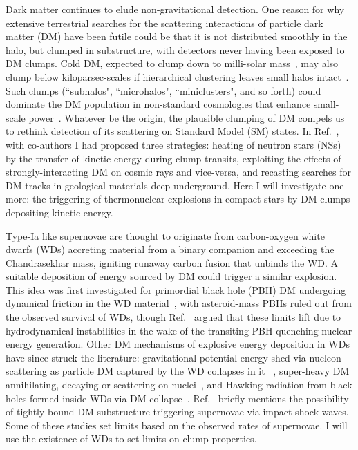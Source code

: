 \documentclass[
    twocolumn,
	prd,
        amssymb,
	preprintnumbers,
	secnumarabic,
	nofootinbib,
	superscriptaddress]{revtex4-1}
\begin{document}
Dark matter continues to elude non-gravitational detection.
One reason for why extensive terrestrial searches for the scattering interactions of particle dark matter (DM) have been futile could be that it is not distributed smoothly in the halo, but clumped in substructure, with detectors never having been exposed to DM clumps.
Cold DM, expected to clump down to milli-solar mass~\cite{Zybin:1999ic,Hofmann:2001bi,Berezinsky:2007qu}, 
may also clump below kiloparsec-scales if hierarchical clustering leaves small halos intact~\cite{BergstromGondolo:1998jj,vandenBosch:2017ynq,vandenBosch:2018tyt}.
Such clumps (``subhalos", ``microhalos", ``miniclusters", and so forth) could dominate the DM population in non-standard cosmologies that enhance small-scale power~\cite{ErickcekSigurdson,Barenboim:2013gya,FanWatson,drorcodecay,inflatflucs,Buckley:2017ttd,nussinovcluster,Barenboim:2021swl,Domenech:2023afs}. 
Whatever be the origin, the plausible clumping of DM compels us to rethink detection of its scattering on Standard Model (SM) states. 
In Ref.~\cite{NSvIR:clumps2021}, with co-authors I had proposed three strategies:
heating of neutron stars (NSs) by the transfer of kinetic energy during clump transits, 
exploiting the effects of strongly-interacting DM on cosmic rays and vice-versa,
and recasting searches for DM tracks in geological materials deep underground.
Here I will investigate one more: the triggering of thermonuclear explosions in compact stars by DM clumps depositing kinetic energy.

Type-Ia like supernovae are thought to originate from carbon-oxygen white dwarfs (WDs) accreting material from a binary companion and exceeding the Chandrasekhar mass, igniting runaway carbon fusion that unbinds the WD.
A suitable deposition of energy sourced by DM could trigger a similar explosion. 
This idea was first investigated for primordial black hole (PBH) DM undergoing dynamical friction in the WD material~\cite{GrahamRajendVarelaPBHWD}, with asteroid-mass PBHs ruled out from the observed survival of WDs, though Ref.~\cite{MonteroCamachoHirata2019} argued that these limits lift due to hydrodynamical instabilities in the wake of the transiting PBH quenching nuclear energy generation.
Other DM mechanisms of explosive energy deposition in WDs have since struck the literature: 
gravitational potential energy shed via nucleon scattering as particle DM captured by the WD collapses in it ~\cite{GrahamRajendVarelaPBHWD,Bramante:2015cua,FedderkeWDCHAMPs:2019jur,SteigerwaldProfumo:2022pjo},
super-heavy DM annihilating, decaying or scattering on nuclei~\cite{Graham:2018efk,MACROSidhu2020},
and
Hawking radiation from black holes formed inside WDs via DM collapse~\cite{Acevedo:2019gre,Janish:2019nkk,FedderkeWDCHAMPs:2019jur}.
Ref.~\cite{StellarShocksDas2022} briefly mentions the possibility of tightly bound DM substructure triggering supernovae via impact shock waves. 
Some of these studies set limits based on the observed rates of supernovae.
I will use the existence of WDs to set limits on clump properties.
\end{document}
